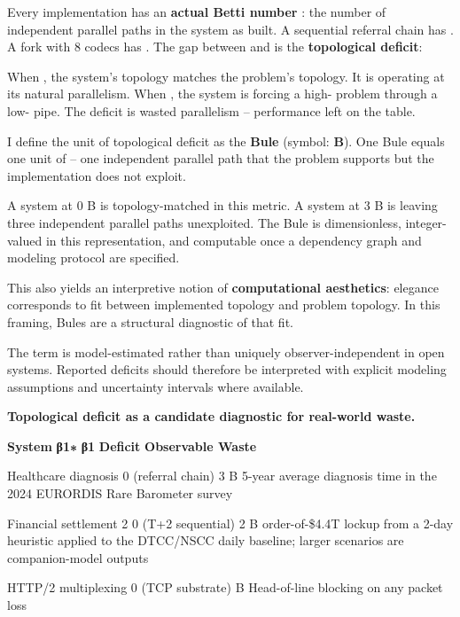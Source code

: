 \documentclass[
]{article}
\begin{document}
Every implementation has an \textbf{actual Betti number} : the number of
independent parallel paths in the system as built. A sequential referral
chain has . A fork with 8 codecs has . The gap between and is the
\textbf{topological deficit}:

When , the system's topology matches the problem's topology. It is
operating at its natural parallelism. When , the system is forcing a
high- problem through a low- pipe. The deficit is wasted parallelism --
performance left on the table.

I define the unit of topological deficit as the \textbf{Bule} (symbol:
\textbf{B}). One Bule equals one unit of -- one independent parallel
path that the problem supports but the implementation does not exploit.

A system at 0 B is topology-matched in this metric. A system at 3 B is
leaving three independent parallel paths unexploited. The Bule is
dimensionless, integer-valued in this representation, and computable
once a dependency graph and modeling protocol are specified.

This also yields an interpretive notion of \textbf{computational
aesthetics}: elegance corresponds to fit between implemented topology
and problem topology. In this framing, Bules are a structural diagnostic
of that fit.

The term is model-estimated rather than uniquely observer-independent in
open systems. Reported deficits should therefore be interpreted with
explicit modeling assumptions and uncertainty intervals where available.

\textbf{Topological deficit as a candidate diagnostic for real-world
waste.}

\textbf{System} \textbar{} \textbf{β1∗\hspace{0pt}} \textbar{}
\textbf{β1\hspace{0pt}} \textbar{} \textbf{Deficit} \textbar{}
\textbf{Observable Waste} \textbar{}

Healthcare diagnosis \textbar{} \textbar{} 0 (referral chain) \textbar{}
3 B \textbar{} 5-year average diagnosis time in the 2024 EURORDIS Rare
Barometer survey

Financial settlement \textbar{} 2 \textbar{} 0 (T+2 sequential)
\textbar{} 2 B \textbar{} order-of-\$4.4T lockup from a 2-day heuristic
applied to the DTCC/NSCC daily baseline; larger scenarios are
companion-model outputs

HTTP/2 multiplexing \textbar{} \textbar{} 0 (TCP substrate) \textbar{} B
\textbar{} Head-of-line blocking on any packet loss \textbar{}
\end{document}
